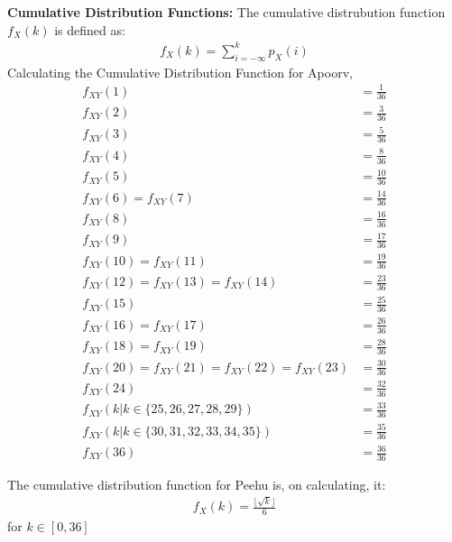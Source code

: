 \documentclass[journal,12pt,twocolumn]{IEEEtran}
\theoremstyle{remark}
\begin{document}
\textbf{Cumulative Distribution Functions:} The cumulative distrubution function $f_X(k)$ is defined as:
\begin{align}
f_X(k) = \sum_{i=-\infty}^{k} p_X(i)
\end{align}
Calculating the Cumulative Distribution Function for Apoorv,
\begin{align}
f_{XY}(1) &= \frac{1}{36}\\
f_{XY}(2) &= \frac{3}{36}\\
f_{XY}(3) &= \frac{5}{36}\\
f_{XY}(4) &= \frac{8}{36}\\
f_{XY}(5) &= \frac{10}{36}\\
f_{XY}(6) = f_{XY}(7) &= \frac{14}{36}\\
f_{XY}(8) &= \frac{16}{36}\\
f_{XY}(9) &= \frac{17}{36}\\
f_{XY}(10) = f_{XY}(11) &= \frac{19}{36}\\
f_{XY}(12) = f_{XY}(13) = f_{XY}(14) &= \frac{23}{36}\\
f_{XY}(15) &= \frac{25}{36}\\
f_{XY}(16) = f_{XY}(17) &= \frac{26}{36}\\
f_{XY}(18) = f_{XY}(19) &= \frac{28}{36}\\
f_{XY}(20) = f_{XY}(21) = f_{XY}(22) = f_{XY}(23) &= \frac{30}{36}\\
f_{XY}(24) &= \frac{32}{36}\\
f_{XY}(k | k \in \{25, 26, 27, 28, 29\}) &= \frac{33}{36}\\
f_{XY}(k | k \in \{30, 31, 32, 33, 34, 35\}) &= \frac{35}{36}\\
f_{XY}(36) &= \frac{36}{36}
\end{align}

The cumulative distribution function for Peehu is, on calculating, it:
\begin{align}
    f_X(k) = \frac{\lfloor\sqrt{k}\rfloor}{6}
\end{align}
for $k \in [0, 36]$
\end{document}

